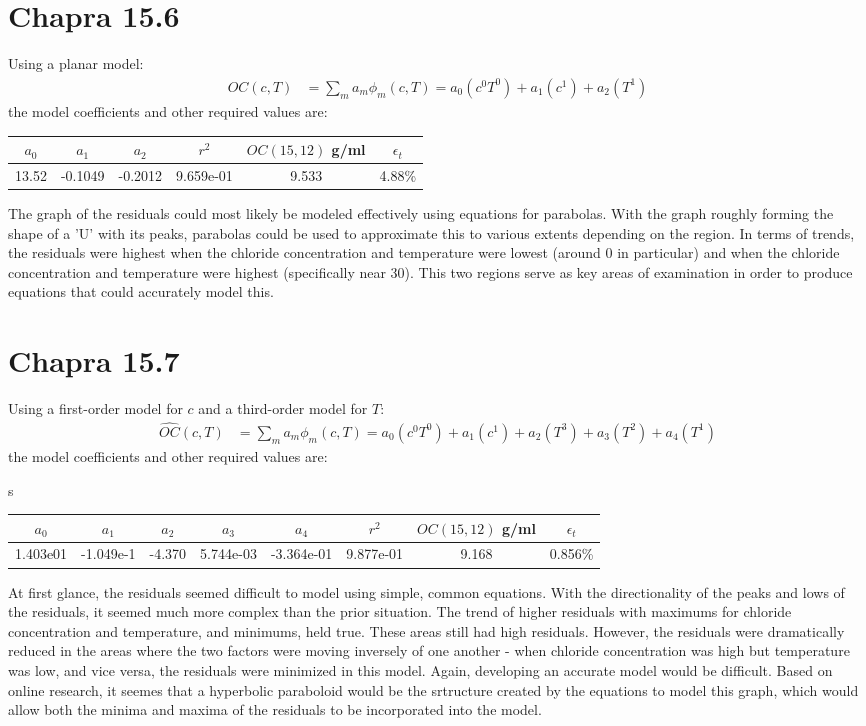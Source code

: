 \documentclass{article}
\begin{document}
\section{Chapra 15.6}
Using a planar model:
\begin{align*}
\hat{OC}(c, T)&=\sum_ma_m\phi_m(c,T)=a_0(c^0T^0)+a_1(c^1)+a_2(T^1)
\end{align*}
the model coefficients and other required values are:
\begin{center}
\begin{tabular}{c|c|c|c|c|c}
$a_0$ & $a_1$ & $a_2$ & $r^2$ & $OC(15, 12)$ g/ml & $\epsilon_t$ \\ \hline
 13.52 & -0.1049 &  -0.2012& 9.659e-01& 9.533 &  4.88\%
\end{tabular}
\end{center}
The graph of the residuals could most likely be modeled effectively using equations for parabolas. With the graph roughly forming the shape of a 'U' with its peaks, parabolas could be used to approximate this to various extents depending on the region. In terms of trends, the residuals were highest when the chloride concentration and temperature were lowest (around 0 in particular) and when the chloride concentration and temperature were highest (specifically near 30). This two regions serve as key areas of examination in order to produce equations that could accurately model this. 

\section{Chapra 15.7}
Using a first-order model for $c$ and a third-order model for $T$:
\begin{align*}
\hat{OC}(c, T)&=
\sum_ma_m\phi_m(c, T)=a_0(c^0T^0)+a_1(c^1)+a_2(T^3)+a_3(T^2)+a_4(T^1) 
\end{align*}
the model coefficients and other required values are:
\begin{center}s
\begin{tabular}{c|c|c|c|c|c|c|c}
$a_0$ & $a_1$ & $a_2$ & $a_3$ & $a_4$ & $r^2$ & $OC(15, 12)$ g/ml & $\epsilon_t$ \\ \hline
1.403e01 & -1.049e-1 & -4.370 & 5.744e-03 & -3.364e-01 & 9.877e-01  & 9.168 & 0.856\%
\end{tabular}
\end{center}
At first glance, the residuals seemed difficult to model using simple, common equations. With the directionality of the peaks and lows of the residuals, it seemed much more complex than the prior situation. The trend of higher residuals with maximums for chloride concentration and temperature, and minimums, held true. These areas still had high residuals. However, the residuals were dramatically reduced in the areas where the two factors were moving inversely of one another - when chloride concentration was high but temperature was low, and vice versa, the residuals were minimized in this model. Again, developing an accurate model would be difficult. Based on online research, it seemes that a hyperbolic paraboloid would be the srtructure created by the equations to model this graph, which would allow both the minima and maxima of the residuals to be incorporated into the model.
\end{document}
